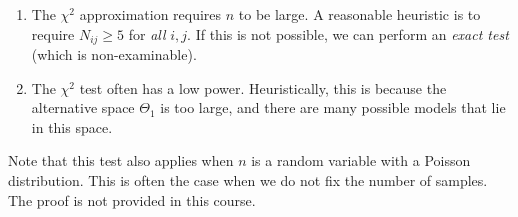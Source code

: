 \begin{enumerate}
	\item The $\chi^2$ approximation requires $n$ to be large.
	      A reasonable heuristic is to require $N_{ij} \geq 5$ for \textit{all} $i,j$.
	      If this is not possible, we can perform an \textit{exact test} (which is non-examinable).
	\item The $\chi^2$ test often has a low power.
	      Heuristically, this is because the alternative space $\Theta_1$ is too large, and there are many possible models that lie in this space.
\end{enumerate}
Note that this test also applies when $n$ is a random variable with a Poisson distribution.
This is often the case when we do not fix the number of samples.
The proof is not provided in this course.

